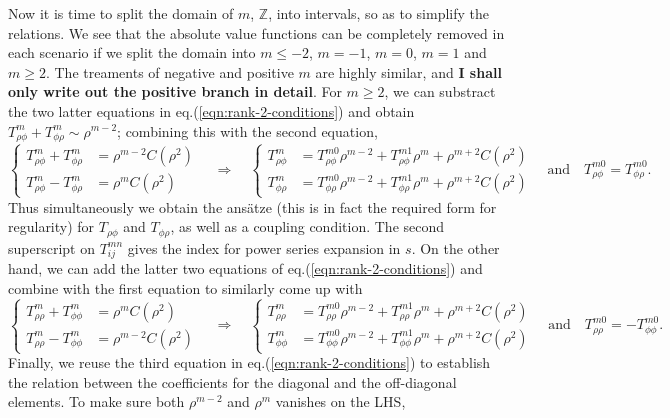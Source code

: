\documentclass[a4paper, 11pt]{article}
\begin{document}
Now it is time to split the domain of $m$, $\mathbb{Z}$, into intervals, so as to simplify the relations. We see that the absolute value functions can be completely removed in each scenario if we split the domain into $m \leq -2$, $m=-1$, $m=0$, $m=1$ and $m\geq 2$. The treaments of negative and positive $m$ are highly similar, and \textbf{I shall only write out the positive branch in detail}. For $m\geq 2$, we can substract the two latter equations in eq.(\ref{eqn:rank-2-conditions}) and obtain $T_{\rho\phi}^m + T_{\phi\rho}^m \sim \rho^{m-2}$; combining this with the second equation,
\[
\left\{\begin{aligned}
    T_{\rho\phi}^m + T_{\phi\rho}^m &= \rho^{m-2} C(\rho^2) \\ 
    T_{\rho\phi}^m - T_{\phi\rho}^m &= \rho^m C(\rho^2)
\end{aligned}\right. \quad \Longrightarrow\quad 
\left\{\begin{aligned}
    T_{\rho\phi}^m &= T_{\rho\phi}^{m0} \rho^{m-2} + T_{\rho\phi}^{m1} \rho^{m} + \rho^{m+2} C(\rho^2) \\ 
    T_{\phi\rho}^m &= T_{\phi\rho}^{m0} \rho^{m-2} + T_{\phi\rho}^{m1} \rho^{m} + \rho^{m+2} C(\rho^2) 
\end{aligned}\right. \quad \mathrm{and} \quad T_{\rho\phi}^{m0} = T_{\phi\rho}^{m0}.
\]
Thus simultaneously we obtain the ansätze (this is in fact the required form for regularity) for $T_{\rho\phi}$ and $T_{\phi\rho}$, as well as a coupling condition. The second superscript on $T_{ij}^{mn}$ gives the index for power series expansion in $s$. On the other hand, we can add the latter two equations of eq.(\ref{eqn:rank-2-conditions}) and combine with the first equation to similarly come up with 
\[
\left\{\begin{aligned}
    T_{\rho\rho}^m + T_{\phi \phi}^m &= \rho^{m} C(\rho^2) \\ 
    T_{\rho\rho}^m - T_{\phi \phi}^m &= \rho^{m-2} C(\rho^2)
\end{aligned}\right. \quad \Longrightarrow\quad 
\left\{\begin{aligned}
    T_{\rho\rho}^m &= T_{\rho\rho}^{m0} \rho^{m-2} + T_{\rho\rho}^{m1} \rho^{m} + \rho^{m+2} C(\rho^2) \\ 
    T_{\phi \phi}^m &= T_{\phi\phi}^{m0} \rho^{m-2} + T_{\phi\phi}^{m1} \rho^{m} + \rho^{m+2} C(\rho^2) 
\end{aligned}\right. \quad \mathrm{and} \quad T_{\rho\rho}^{m0} = - T_{\phi\phi}^{m0}.
\]
Finally, we reuse the third equation in eq.(\ref{eqn:rank-2-conditions}) to establish the relation between the coefficients for the diagonal and the off-diagonal elements. To make sure both $\rho^{m-2}$ and $\rho^m$ vanishes on the LHS,
\end{document}
